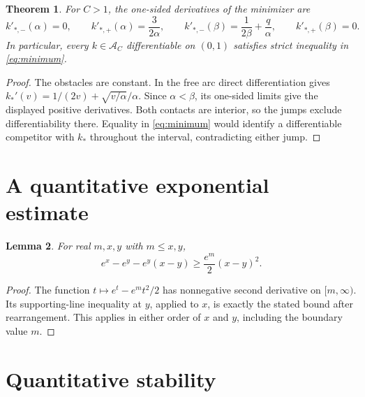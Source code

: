 \documentclass[11pt]{article}
\newtheorem{theorem}{Theorem}[section]
\newtheorem{lemma}[theorem]{Lemma}
\begin{document}
\begin{theorem}\label{thm:contacts}
For $C>1$, the one-sided derivatives of the minimizer are
\[
 k'_{*,-}(\alpha)=0,\qquad k'_{*,+}(\alpha)=\frac3{2\alpha},
 \qquad
 k'_{*,-}(\beta)=\frac1{2\beta}+\frac q\alpha,
 \qquad k'_{*,+}(\beta)=0.
\]
In particular, every $k\in\mathcal A_C$ differentiable on $(0,1)$
satisfies strict inequality in \eqref{eq:minimum}.
\end{theorem}

\begin{proof}
The obstacles are constant. In the free arc direct differentiation gives
$k_*'(v)=1/(2v)+\sqrt{v/\alpha}/\alpha$. Since $\alpha<\beta$, its
one-sided limits give the displayed positive derivatives. Both contacts
are interior, so the jumps exclude differentiability there. Equality
in \eqref{eq:minimum} would identify a differentiable competitor with
$k_*$ throughout the interval, contradicting either jump.
\end{proof}

\section{A quantitative exponential estimate}

\begin{lemma}\label{lem:quadratic}
For real $m,x,y$ with $m\leq x,y$,
\[
 e^x-e^y-e^y(x-y)\geq\frac{e^m}{2}(x-y)^2.
\]
\end{lemma}
\begin{proof}
The function $t\mapsto e^t-e^mt^2/2$ has nonnegative second derivative
on $[m,\infty)$. Its supporting-line inequality at $y$, applied to $x$,
is exactly the stated bound after rearrangement. This applies in either
order of $x$ and $y$, including the boundary value $m$.
\end{proof}

\section{Quantitative stability}
\end{document}
